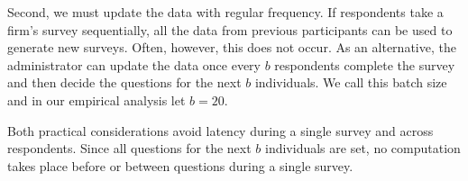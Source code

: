\documentclass[a4paper,11pt]{article}
\begin{document}
Second, we must update the data with regular frequency. If respondents take a firm's survey sequentially, all the data from previous participants can be used to generate new surveys. Often, however, this does not occur. As an alternative, the administrator can update the data once every $b$ respondents complete the survey and then decide the questions for the next $b$ individuals. We call this batch size and in our empirical analysis let $b=20$.

Both practical considerations avoid latency during a single survey and across respondents. Since all questions for the next $b$ individuals are set, no computation takes place before or between questions during a single survey.
\end{document}
